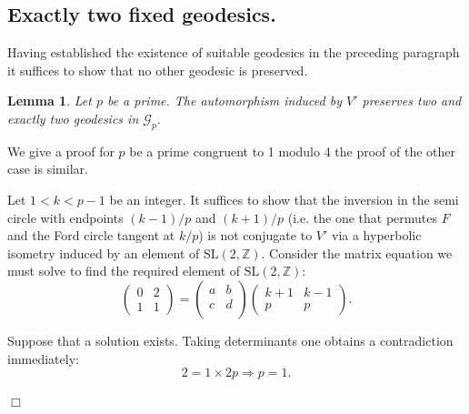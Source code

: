 \documentclass[12pt,a4paper]{amsart}
\newtheorem{lem}[thm]{Lemma}
\def\ZZ{\mathbb{Z}}
\def\sl2{\mathrm{SL}(2, \ZZ)}
\def\ggp{\mathcal{G}_p}
\begin{document}
\subsection{Exactly two fixed geodesics.}

Having established the existence of suitable geodesics in the preceding paragraph
it suffices to show that no other geodesic is preserved.


\begin{lem} \label{the end}
Let $p$ be a prime.
The automorphism induced by $V'$ preserves two and exactly two geodesics in $\ggp$.
\end{lem}


\proof 
We give a proof for  $p$ be a prime congruent to 1 modulo 4
the proof of the other case is similar.

Let $1< k < p-1$  be an integer. 
It suffices to show that the inversion in the semi circle with endpoints  
 $(k-1)/p$ and  $(k+1)/p$
(i.e. the one that permutes $F$ and the Ford circle tangent at $k/p$)
is not conjugate to $V'$ 
via a hyperbolic isometry induced by an element of $\sl2$.
Consider the  matrix equation we must solve 
to find the required element of $\sl2$:
\begin{equation}
\begin{pmatrix}
0& 2\\
1 & 1
\end{pmatrix}
= 
\begin{pmatrix}
a & b \\
c & d\\
\end{pmatrix}
\begin{pmatrix}
k + 1 & k-1 \\
p  & p
\end{pmatrix}.
\end{equation}

Suppose that a solution exists. Taking determinants one obtains a contradiction immediately:
$$ 2 = 1 \times 2p \Rightarrow p = 1.$$

\hfill $\Box$


\end{document}

